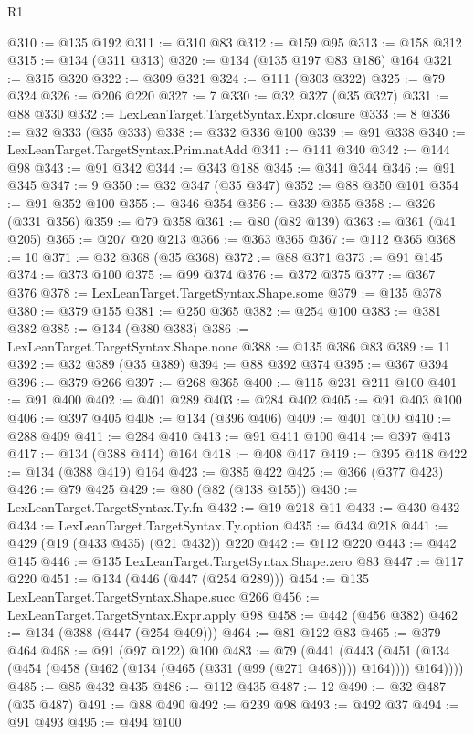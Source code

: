 \begin{lexlean}{R1}
\begin{coremodule}
@310 := @135 @192
@311 := @310 @83
@312 := @159 @95
@313 := @158 @312
@315 := @134 (@311 @313)
@320 := @134 (@135 @197 @83 @186) @164
@321 := @315 @320
@322 := @309 @321
@324 := @111 (@303 @322)
@325 := @79 @324
@326 := @206 @220
@327 := 7
@330 := @32 @327 (@35 @327)
@331 := @88 @330
@332 := LexLeanTarget.TargetSyntax.Expr.closure
@333 := 8
@336 := @32 @333 (@35 @333)
@338 := @332 @336 @100
@339 := @91 @338
@340 := LexLeanTarget.TargetSyntax.Prim.natAdd
@341 := @141 @340
@342 := @144 @98
@343 := @91 @342
@344 := @343 @188
@345 := @341 @344
@346 := @91 @345
@347 := 9
@350 := @32 @347 (@35 @347)
@352 := @88 @350 @101
@354 := @91 @352 @100
@355 := @346 @354
@356 := @339 @355
@358 := @326 (@331 @356)
@359 := @79 @358
@361 := @80 (@82 @139)
@363 := @361 (@41 @205)
@365 := @207 @20 @213
@366 := @363 @365
@367 := @112 @365
@368 := 10
@371 := @32 @368 (@35 @368)
@372 := @88 @371
@373 := @91 @145
@374 := @373 @100
@375 := @99 @374
@376 := @372 @375
@377 := @367 @376
@378 := LexLeanTarget.TargetSyntax.Shape.some
@379 := @135 @378
@380 := @379 @155
@381 := @250 @365
@382 := @254 @100
@383 := @381 @382
@385 := @134 (@380 @383)
@386 := LexLeanTarget.TargetSyntax.Shape.none
@388 := @135 @386 @83
@389 := 11
@392 := @32 @389 (@35 @389)
@394 := @88 @392 @374
@395 := @367 @394
@396 := @379 @266
@397 := @268 @365
@400 := @115 @231 @211 @100
@401 := @91 @400
@402 := @401 @289
@403 := @284 @402
@405 := @91 @403 @100
@406 := @397 @405
@408 := @134 (@396 @406)
@409 := @401 @100
@410 := @288 @409
@411 := @284 @410
@413 := @91 @411 @100
@414 := @397 @413
@417 := @134 (@388 @414) @164
@418 := @408 @417
@419 := @395 @418
@422 := @134 (@388 @419) @164
@423 := @385 @422
@425 := @366 (@377 @423)
@426 := @79 @425
@429 := @80 (@82 (@138 @155))
@430 := LexLeanTarget.TargetSyntax.Ty.fn
@432 := @19 @218 @11
@433 := @430 @432
@434 := LexLeanTarget.TargetSyntax.Ty.option
@435 := @434 @218
@441 := @429 (@19 (@433 @435) (@21 @432)) @220
@442 := @112 @220
@443 := @442 @145
@446 := @135 LexLeanTarget.TargetSyntax.Shape.zero @83
@447 := @117 @220
@451 := @134 (@446 (@447 (@254 @289)))
@454 := @135 LexLeanTarget.TargetSyntax.Shape.succ @266
@456 := LexLeanTarget.TargetSyntax.Expr.apply @98
@458 := @442 (@456 @382)
@462 := @134 (@388 (@447 (@254 @409)))
@464 := @81 @122 @83
@465 := @379 @464
@468 := @91 (@97 @122) @100
@483 := @79
    (@441
      (@443 (@451 (@134 (@454 (@458 (@462 (@134 (@465 (@331 (@99 (@271 @468)))) @164)))) @164))))
@485 := @85 @432 @435
@486 := @112 @435
@487 := 12
@490 := @32 @487 (@35 @487)
@491 := @88 @490
@492 := @239 @98
@493 := @492 @37
@494 := @91 @493
@495 := @494 @100

\end{coremodule}
\end{lexlean}
